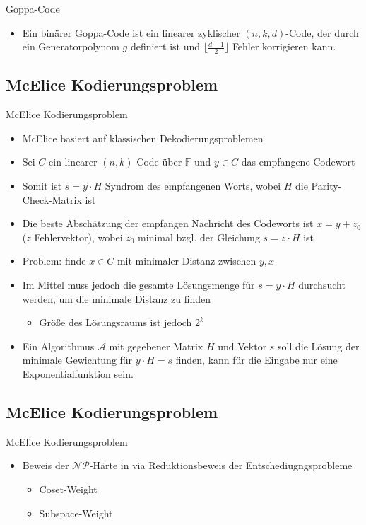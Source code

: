 \documentclass[11pt%
,aspectratio=169%
]{beamer}
\begin{document}
\begin{frame}{Goppa-Code}
	\begin{itemize}
		\item Ein binärer Goppa-Code ist ein linearer zyklischer $(n,k,d)$-Code, der durch ein Generatorpolynom $g$ definiert ist und $\lfloor \frac{d-1}{2} \rfloor$ Fehler korrigieren kann. 

	
  \end{itemize}
\end{frame}

\subsection{McElice Kodierungsproblem}
\begin{frame}{McElice Kodierungsproblem}
    \begin{itemize}
        \item McElice basiert auf klassischen Dekodierungsproblemen \cite{berlekamp1978inherent}
        \item Sei $C$ ein linearer $(n,k)$ Code über $\mathbb{F}$ und $y \in C$ das empfangene Codewort
        \item Somit ist $s = y \cdot H$ Syndrom des empfangenen Worts, wobei $H$ die Parity-Check-Matrix ist
        \item Die beste Abschätzung der empfangen Nachricht des Codeworts ist $x= y + z_0$ ($z$ Fehlervektor), wobei $z_0$ minimal bzgl. der Gleichung $s=z \cdot H$ ist
        \item Problem: finde $x \in C$ mit minimaler Distanz zwischen $y,x$ 
        \item Im Mittel muss jedoch die gesamte Lösungsmenge für $s=y \cdot H$ durchsucht werden, um die minimale Distanz zu finden
        \begin{itemize}
            \item Größe des Lösungsraums ist jedoch $2^k$
        \end{itemize}
        \item Ein Algorithmus $\mathcal{A}$ mit gegebener Matrix $H$ und Vektor $s$ soll die Lösung der minimale Gewichtung für $y \cdot H = s$ finden, kann für die Eingabe nur eine Exponentialfunktion sein.
    \end{itemize}
\end{frame}

\subsection{McElice Kodierungsproblem}
\begin{frame}{McElice Kodierungsproblem}
    \begin{itemize}
        \item Beweis der $\mathcal{NP}$-Härte in \cite{berlekamp1978inherent} via Reduktionsbeweis der Entschediugngsprobleme
        \begin{itemize}
            \item Coset-Weight
            \item Subspace-Weight
        \end{itemize}
    \end{itemize}
\end{frame}
\end{document}
